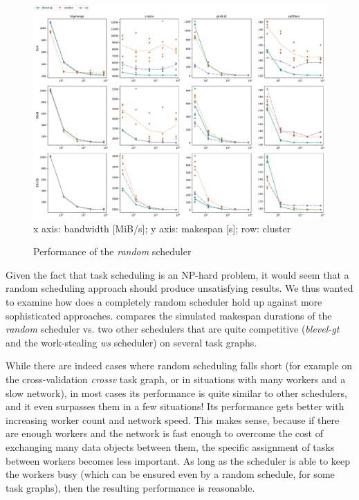 \begin{figure}
	\caption{Performance of the \emph{random} scheduler}
	\label{fig:estee-chart-random-scheduler}
	\centering
	\includegraphics[width=\textwidth]{imgs/estee/charts/random-scheduler}\\
	{\small x axis: bandwidth [MiB/s]; y axis: makespan [s]; row: cluster}
\end{figure}

Given the fact that task scheduling is an NP-hard problem, it would seem that a random scheduling
approach should produce unsatisfying results. We thus wanted to examine how does a completely
random scheduler hold up against more sophisticated approaches.  compares
the simulated makespan durations of the \emph{random} scheduler vs. two other schedulers
that are quite competitive (\emph{blevel-gt} and the work-stealing \emph{ws}
scheduler) on several task graphs.

While there are indeed cases where random scheduling falls short (for example on the
cross-validation \emph{crossv} task graph, or in situations with many workers and a slow
network), in most cases its performance is quite similar to other schedulers, and it even surpasses
them in a few situations! Its performance gets better with increasing worker count and network
speed. This makes sense, because if there are enough workers and the network is fast enough to
overcome the cost of exchanging many data objects between them, the specific assignment of tasks
between workers becomes less important. As long as the scheduler is able to keep the workers busy
(which can be ensured even by a random schedule, for some task graphs), then the resulting
performance is reasonable.


